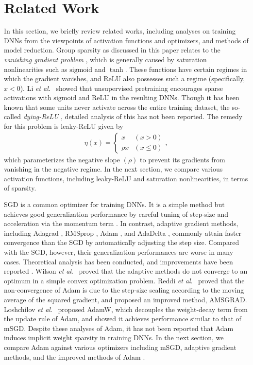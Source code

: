 \documentclass[conference]{IEEEtran}
\newcommand{\etal}{\textit{et al}.}
\begin{document}
\section{Related Work}\label{sec:related_work}
In this section, we briefly review related works, including analyses on training DNNs from the viewpoints of activation functions and optimizers, and methods of model reduction.
Group sparsity as discussed in this paper relates to the \textit{vanishing gradient problem} \cite{Bengio_1994}, which is generally caused by saturation nonlinearities such as $\mathrm{sigmoid}$ and $\tanh$.
These functions have certain regimes in which the gradient vanishes, and ReLU also possesses such a regime (specifically, $x < 0$). 
Li \etal~\cite{JLi_2017} showed that unsupervised pretraining encourages sparse activations with $\mathrm{sigmoid}$ and ReLU in the resulting DNNs.
Though it has been known that some units never activate across the entire training dataset, the so-called \textit{dying-ReLU} \cite{Li_2015}, detailed analysis of this has not been reported. 
The remedy for this problem is leaky-ReLU \cite{Maas_2013} given by 
\begin{align}
	\eta(x)
	 = 
	\left \{
		\begin{array}{ll}
		x		&	\left(x > 0 \right) \\
		\rho x	&	\left(x \leq 0 \right) 
		\end{array},
	\right.
\end{align}
which parameterizes the negative slope $(\rho)$ to prevent its gradients from vanishing in the negative regime.
In the next section, we compare various activation functions, including leaky-ReLU and saturation nonlinearities, in terms of sparsity. 

SGD is a common optimizer for training DNNs. 
It is a simple method but achieves good generalization performance by careful tuning of step-size and acceleration via the momentum term \cite{Qian_1999}.
In contrast, adaptive gradient methods, including Adagrad \cite{Duchi_2011}, RMSprop \cite{Tieleman_2012}, Adam \cite{Kingma_2015}, and AdaDelta \cite{Zeiler_2012}, commonly attain faster convergence than the SGD by automatically adjusting the step size.
Compared with the SGD, however, their generalization performances are worse in many cases. Theoretical analysis has been conducted, and improvements have been reported \cite{Wilson_2017,Reddi_2018,Loshchilov_2017}.
Wilson \etal~\cite{Wilson_2017} proved that the adaptive methods do not converge to an optimum in a simple convex optimization problem.
Reddi \etal~\cite{Reddi_2018} proved that the non-convergence of Adam is due to the step-size scaling according to the moving average of the squared gradient, and proposed an improved method, AMSGRAD.
Loshchilov \etal~\cite{Loshchilov_2017} proposed AdamW, which decouples the weight-decay term from the update rule of Adam, and showed it achieves performance similar to that of mSGD.
Despite these analyses of Adam, it has not been reported that Adam induces implicit weight sparsity in training DNNs.
In the next section, we compare Adam against various optimizers including mSGD, adaptive gradient methods, and the improved methods of Adam \cite{Reddi_2018,Loshchilov_2017}. 
\end{document}
